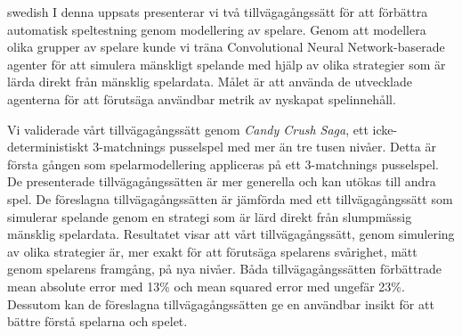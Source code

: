 \begin{foreignabstract}{swedish}
I denna uppsats presenterar vi två tillvägagångssätt för att förbättra automatisk speltestning genom modellering av spelare. Genom att modellera olika grupper av spelare kunde vi träna Convolutional Neural Network-baserade agenter för att simulera mänskligt spelande med hjälp av olika strategier som är lärda direkt från mänsklig spelardata. Målet är att använda de utvecklade agenterna för att förutsäga användbar metrik av nyskapat spelinnehåll.

Vi validerade vårt tillvägagångssätt genom \textit{Candy Crush Saga}, ett icke-deterministiskt 3-matchnings pusselspel med mer än tre tusen nivåer. Detta är första gången som spelarmodellering appliceras på ett 3-matchnings pusselspel. De presenterade tillvägagångssätten är mer generella och kan utökas till andra spel. De föreslagna tillvägagångssätten är jämförda med ett tillvägagångssätt som simulerar spelande genom en strategi som är lärd direkt från slumpmässig mänsklig spelardata. Resultatet visar att vårt tillvägagångssätt, genom simulering av olika strategier är, mer exakt för att förutsäga spelarens svårighet, mätt genom spelarens framgång, på nya nivåer. Båda tillvägagångssätten förbättrade mean absolute error med 13\% och mean squared error med ungefär 23\%. Dessutom kan de föreslagna tillvägagångssätten ge en användbar insikt för att bättre förstå spelarna och spelet.

\end{foreignabstract}